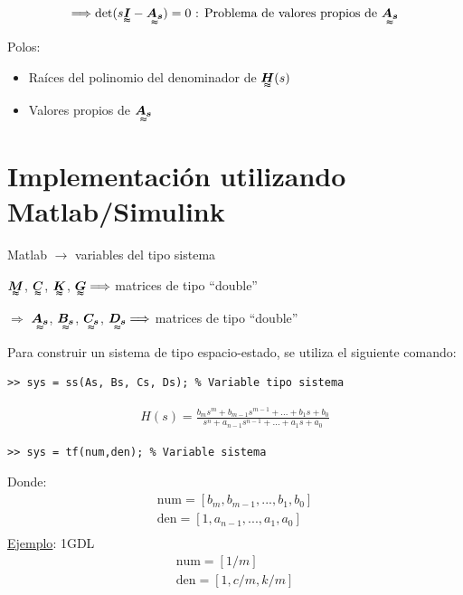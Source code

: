 \begin{align*}
    \Longrightarrow\det(s\tenq{I}-\tenq{A_s})=0 ~\text{: Problema de valores propios de }\tenq{A_s}
\end{align*}

Polos:
\begin{itemize}
    \item Raíces del polinomio del denominador de $\tenq{H}(s)$
    \item Valores propios de $\tenq{A_s}$
\end{itemize}

\section{Implementación utilizando Matlab/Simulink}
Matlab $\longrightarrow$ variables del tipo sistema\\
\par $\tenq{M}$, $\tenq{C}$, $\tenq{K}$, $\tenq{G} \Longrightarrow$ matrices de tipo ``double'' \\

\par $\Longrightarrow$ $\tenq{A_s}$, $\tenq{B_s}$, $\tenq{C_s}$, $\tenq{D_s} \Longrightarrow$ matrices de tipo ``double''\\
\par Para construir un sistema de tipo espacio-estado, se utiliza el siguiente comando:
\begin{verbatim}
>> sys = ss(As, Bs, Cs, Ds); % Variable tipo sistema 
\end{verbatim}

\begin{align*}
    H(s)=\frac{b_ms^m+b_{m-1}s^{m-1}+...+b_1s+b_0}{s^n+a_{n-1}s^{n-1}+...+a_1s+a_0}
\end{align*}

\begin{verbatim}
>> sys = tf(num,den); % Variable sistema 
\end{verbatim}
Donde:
\begin{align*}
    \text{num} = [b_m, b_{m-1}, ... , b_1, b_0]\\
    \text{den} = [1, a_{n-1}, ... , a_1, a_0]\\
\end{align*}
\underline{Ejemplo}: 1GDL
\begin{align*}
    \text{num} = [1/m]\\
    \text{den} = [1, c/m, k/m]\\
\end{align*}

